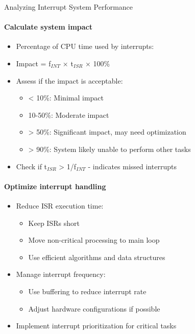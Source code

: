 \begin{KR}{Analyzing Interrupt System Performance}
\paragraph{Calculate system impact}
\begin{itemize}
    \item Percentage of CPU time used by interrupts:
    \item Impact = f$_{INT}$ × t$_{ISR}$ × 100\%
    \item Assess if the impact is acceptable:
    \begin{itemize}
        \item < 10\%: Minimal impact
        \item 10-50\%: Moderate impact
        \item > 50\%: Significant impact, may need optimization
        \item > 90\%: System likely unable to perform other tasks
    \end{itemize}
    \item Check if t$_{ISR}$ > 1/f$_{INT}$ - indicates missed interrupts
\end{itemize}

\paragraph{Optimize interrupt handling}
\begin{itemize}
    \item Reduce ISR execution time:
    \begin{itemize}
        \item Keep ISRs short
        \item Move non-critical processing to main loop
        \item Use efficient algorithms and data structures
    \end{itemize}
    \item Manage interrupt frequency:
    \begin{itemize}
        \item Use buffering to reduce interrupt rate
        \item Adjust hardware configurations if possible
    \end{itemize}
    \item Implement interrupt prioritization for critical tasks
\end{itemize}
\end{KR}

